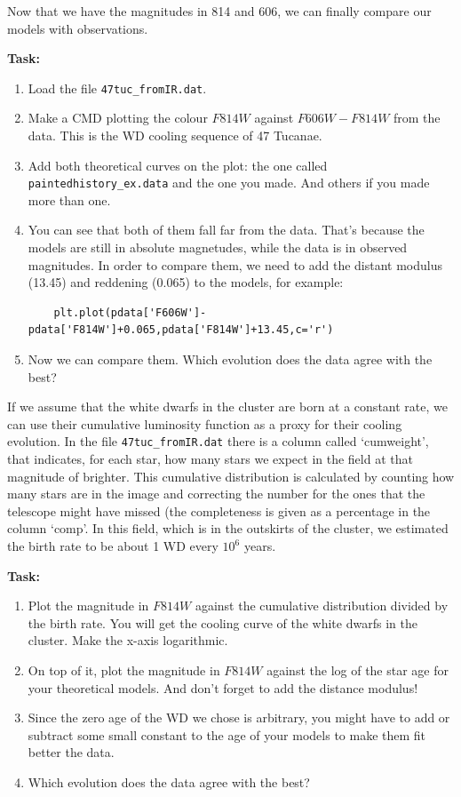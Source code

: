 \documentclass{article}
\begin{document}
Now that we have the magnitudes in 814 and 606, we can finally compare our models with observations.

\textbf{Task:}\vspace{-1em}
\begin{enumerate}
\item Load the file \texttt{47tuc\_fromIR.dat}.
\item Make a CMD plotting the colour $F814W$ against $F606W-F814W$ from the data. This is the WD cooling sequence of 47 Tucanae.
\item Add both theoretical curves on the plot: the one called \texttt{paintedhistory\_ex.data} and the one you made. And others if you made more than one.
\item You can see that both of them fall far from the data. That's because the models are still in absolute magnetudes, while the data is in observed magnitudes. In order to compare them, we need to add the distant modulus (13.45) and reddening (0.065) to the models, for example:
\begin{verbatim}
    plt.plot(pdata['F606W']-pdata['F814W']+0.065,pdata['F814W']+13.45,c='r')
\end{verbatim}
\item Now we can compare them. Which evolution does the data agree with the best?
\end{enumerate}

If we assume that the white dwarfs in the cluster are born at a constant rate, we can use their cumulative luminosity function as a proxy for their cooling evolution. In the file \texttt{47tuc\_fromIR.dat} there is a column called `cumweight', that indicates, for each star, how many stars we expect in the field at that magnitude of brighter. This cumulative distribution is calculated by counting how many stars are in the image and correcting the number for the ones that the telescope might have missed (the completeness is given as a percentage in the column `comp'. In this field, which is in the outskirts of the cluster, we estimated the birth rate to be about 1 WD every $10^6$ years.

\textbf{Task:}\vspace{-1em}
\begin{enumerate}
\item Plot the magnitude in $F814W$ against the cumulative distribution divided by the birth rate. You will get the cooling curve of the white dwarfs in the cluster. Make the x-axis logarithmic.
\item On top of it, plot the magnitude in $F814W$ against the log of the star age for your theoretical models. And don't forget to add the distance modulus!
\item Since the zero age of the WD we chose is arbitrary, you might have to add or subtract some small constant to the age of your models to make them fit better the data. 
\item Which evolution does the data agree with the best?
\end{enumerate}
\end{document}
